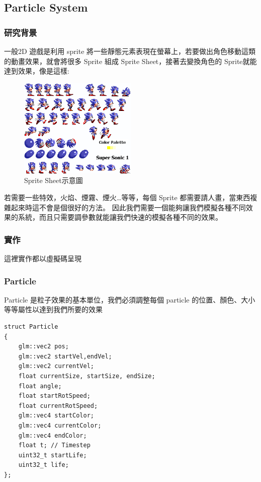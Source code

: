 \subsection{Particle System} %
\label{sub:Particle System}
\subsubsection{研究背景}

一般2D 遊戲是利用 sprite 將一些靜態元素表現在螢幕上，若要做出角色移動這類的動畫效果，就會將很多 Sprite 組成 Sprite Sheet，接著去變換角色的 Sprite就能達到效果，像是這樣:

\begin{figure}[h]
    \begin{center}
    \includegraphics[width=0.5\textwidth]{./resources/particleSystem/example.png}
    \end{center}
\caption{Sprite Sheet示意圖}
\label{fig:particle_1}
\end{figure}

若需要一些特效，火焰、煙霧、煙火…等等，每個 Sprite 都需要請人畫，當東西複雜起來時這不會是個很好的方法。
因此我們需要一個能夠讓我們模擬各種不同效果的系統，而且只需要調參數就能讓我們快速的模擬各種不同的效果。

\subsubsection{實作}
這裡實作都以虛擬碼呈現

\subsubsection{Particle}

Particle 是粒子效果的基本單位，我們必須調整每個 particle 的位置、顏色、大小等等屬性以達到我們所要的效果

\begin{lstlisting}
struct Particle
{
    glm::vec2 pos;
    glm::vec2 startVel,endVel;
    glm::vec2 currentVel;
    float currentSize, startSize, endSize;
    float angle;
    float startRotSpeed;
    float currentRotSpeed;
    glm::vec4 startColor;
    glm::vec4 currentColor;
    glm::vec4 endColor;
    float t; // Timestep
    uint32_t startLife;
    uint32_t life;
};
\end{lstlisting}

